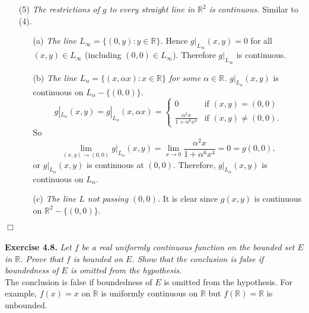 \documentclass{article}
\begin{document}
\begin{enumerate}
\item[(5)]
\emph{The restrictions of $g$ to every straight line
in $\mathbb{R}^2$ is continuous.}
Similar to (4).
  \begin{enumerate}
  \item[(a)]
  \emph{The line $L_{\infty} = \{(0,y) : y \in \mathbb{R} \}$.}
  Hence $g|_{L_{\infty}}(x,y) = 0$ for all $(x,y) \in L_{\infty}$
  (including $(0,0) \in L_{\infty}$).
  Therefore $g|_{L_{\infty}}$ is continuous.
  \item[(b)]
  \emph{The line $L_{\alpha} = \{(x,\alpha x) : x \in \mathbb{R} \}$
  for some $\alpha \in \mathbb{R}$.}
  $g|_{L_{\alpha}}(x,y)$ is continuous on $L_{\alpha} - \{(0,0)\}$.
  \begin{equation*}
    g|_{L_{\alpha}}(x,y) =
    g|_{L_{\alpha}}(x,\alpha x) =
    \begin{cases}
      0                                   & \text{if $(x,y) = (0,0)$} \\
      \frac{\alpha^2 x}{1 + \alpha^6 x^4} & \text{if $(x,y) \neq (0,0)$}.
    \end{cases}
  \end{equation*}
  So
  \[
    \lim_{(x,y) \to (0,0)} g|_{L_{\alpha}}(x,y)
    = \lim_{x \to 0} \frac{\alpha^2 x}{1 + \alpha^6 x^4}
    = 0
    = g(0,0),
  \]
  or $g|_{L_{\alpha}}(x,y)$ is continuous at $(0,0)$.
  Therefore, $g|_{L_{\alpha}}(x,y)$ is continuous on $L_{\alpha}$.
  \item[(c)]
  \emph{The line $L$ not passing $(0,0)$.}
  It is clear since $g(x,y)$ is continuous on $\mathbb{R}^2 - \{(0,0)\}$.
  \end{enumerate}
\end{enumerate}
$\Box$ \\\\






\textbf{Exercise 4.8.}
\emph{Let $f$ be a real uniformly continuous function
on the bounded set $E$ in $\mathbb{R}$.
Prove that $f$ is bounded on $E$.
Show that the conclusion is false
if boundedness of $E$ is omitted from the hypothesis.} \\

The conclusion is false if boundedness of $E$ is omitted from the hypothesis.
For example, $f(x) = x$ on $\mathbb{R}$ is uniformly continuous on $\mathbb{R}$
but $f(\mathbb{R}) = \mathbb{R}$ is unbounded. \\
\end{document}
